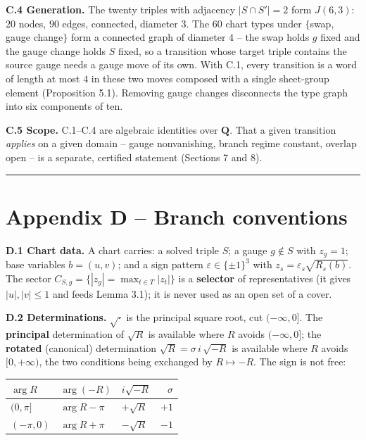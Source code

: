 \textbf{C.4 Generation.} The twenty triples with adjacency \(|S \cap S'| = 2\) form \(J(6,3)\): \(20\) nodes, \(90\) edges, connected, diameter \(3\). The \(60\) chart types under \(\{\)swap, gauge change\(\}\) form a connected graph of diameter \(4\) -- the swap holds \(g\) fixed and the gauge change holds \(S\) fixed, so a transition whose target triple contains the source gauge needs a gauge move of its own. With C.1, every transition is a word of length at most \(4\) in these two moves composed with a single sheet-group element (Proposition 5.1). Removing gauge changes disconnects the type graph into six components of ten.

\textbf{C.5 Scope.} C.1--C.4 are algebraic identities over \(\mathbf{Q}\). That a given transition \emph{applies} on a given domain -- gauge nonvanishing, branch regime constant, overlap open -- is a separate, certified statement (Sections 7 and 8).

\begin{center}\rule{\linewidth}{0.5pt}\end{center}

\section{Appendix D -- Branch conventions}\label{appendix-d-branch-conventions}

\textbf{D.1 Chart data.} A chart carries: a solved triple \(S\); a gauge \(g \notin S\) with \(z_g = 1\); base variables \(b = (u,v)\); and a sign pattern \(\varepsilon \in \{\pm 1\}^3\) with \(z_s = \varepsilon_s \sqrt{R_s(b)}\). The sector \(C_{S,g} = \{|z_g| = \max_{t \in T} |z_t|\}\) is a \textbf{selector} of representatives (it gives \(|u|, |v| \le 1\) and feeds Lemma 3.1); it is never used as an open set of a cover.

\textbf{D.2 Determinations.} \(\sqrt{\cdot}\) is the principal square root, cut \((-\infty, 0]\). The \textbf{principal} determination of \(\sqrt{R}\) is available where \(R\) avoids \((-\infty,0]\); the \textbf{rotated} (canonical) determination \(\sqrt{R} = \sigma\, i\, \sqrt{-R}\) is available where \(R\) avoids \([0,+\infty)\), the two conditions being exchanged by \(R \mapsto -R\). The sign is not free:

\begin{longtable}[]{@{}lllr@{}}
\toprule\noalign{}
\(\arg R\) & \(\arg(-R)\) & \(i\sqrt{-R}\) & \(\sigma\) \\
\midrule\noalign{}
\endhead
\bottomrule\noalign{}
\endlastfoot
\((0, \pi]\) & \(\arg R - \pi\) & \(+\sqrt{R}\) & \(+1\) \\
\((-\pi, 0)\) & \(\arg R + \pi\) & \(-\sqrt{R}\) & \(-1\) \\
\end{longtable}

